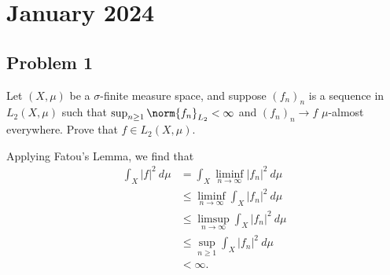 \documentclass[10pt]{mypackage}
\begin{document}
\section{January 2024}%
\subsection{Problem 1}%
\begin{problem}
  Let $\left( X,\mu \right)$ be a $\sigma$-finite measure space, and suppose $\left( f_n \right)_n$ is a sequence in $L_2\left( X,\mu \right)$ such that $\sup_{n\geq 1}\norm{f_n}_{L_2} < \infty$ and $\left( f_n \right)_n\rightarrow f$ $\mu$-almost everywhere. Prove that $f\in L_2\left( X,\mu \right)$.
\end{problem}
Applying Fatou's Lemma, we find that
\begin{align*}
  \int_{X}^{} \left\vert f \right\vert^2\:d\mu &= \int_{X}^{} \liminf_{n\rightarrow\infty}\left\vert f_n \right\vert^2\:d\mu\\
                                               &\leq \liminf_{n\rightarrow\infty} \int_{X}^{} \left\vert f_n \right\vert^2\:d\mu\\
                                               &\leq \limsup_{n\rightarrow\infty} \int_{X}^{} \left\vert f_n \right\vert^2\:d\mu\\
                                               &\leq \sup_{n\geq 1} \int_{X}^{} \left\vert f_n \right\vert^2\:d\mu\\
                                               &< \infty.
\end{align*}
\end{document}
